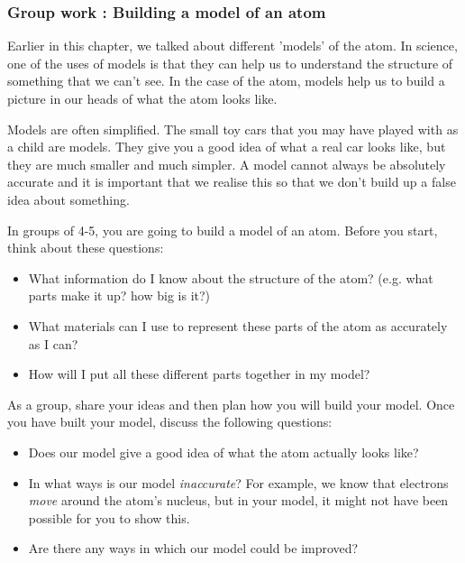             \subsubsection{ Group work : Building a model of an atom         }
            \nopagebreak
            \label{m38741*id260472}Earlier in this chapter, we talked about different 'models' of the atom. In science, one of the uses of models is that they can help us to understand the structure of something that we can't see. In the case of the atom, models help us to build a picture in our heads of what the atom looks like.\par 
        \label{m38741*id260480}Models are often simplified. The small toy cars that you may have played with as a child are models. They give you a good idea of what a real car looks like, but they are much smaller and much simpler. A model cannot always be absolutely accurate and it is important that we realise this so that we don't build up a false idea about something.\par 
        \label{m38741*id260488}In groups of 4-5, you are going to build a model of an atom. Before you start, think about these questions:\par 
        \label{m38741*id260495}\begin{itemize}[noitemsep]
            \label{m38741*uid114}\item What information do I know about the structure of the atom? (e.g. what parts make it up? how big is it?)
\label{m38741*uid115}\item What materials can I use to represent these parts of the atom as accurately as I can?
\label{m38741*uid116}\item How will I put all these different parts together in my model?
\end{itemize}
        \label{m38741*id260537}As a group, share your ideas and then plan how you will build your model. Once you have built your model, discuss the following questions:\par 
        \label{m38741*id260542}\begin{itemize}[noitemsep]
            \label{m38741*uid117}\item Does our model give a good idea of what the atom actually looks like?
\label{m38741*uid118}\item In what ways is our model \textsl{inaccurate}? For example, we know that electrons \textsl{move} around the atom's nucleus, but in your model, it might not have been possible for you to show this.
\label{m38741*uid119}\item Are there any ways in which our model could be improved?
\end{itemize}
